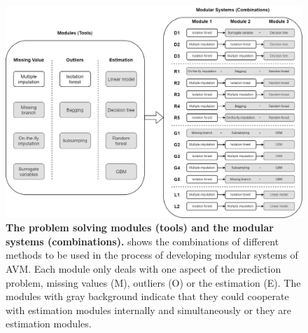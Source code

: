 \begin{figure}[ht]
\begin{center}
\includegraphics[scale=0.25]{./images/approach_tools_appendix}
\caption{{\bf The problem solving modules (tools) and the modular systems (combinations).} shows the combinations of different methods to be used in the process of developing modular systems of AVM. Each module only deals with one aspect of the prediction problem, missing values (M), outliers (O) or the estimation (E). The modules with gray background indicate that they could cooperate with estimation modules internally and simultaneously or they are estimation modules.\setlength{\baselineskip}{1.25em}}
\label{fig_approach_tools_all_complement}
\end{center}
\end{figure}